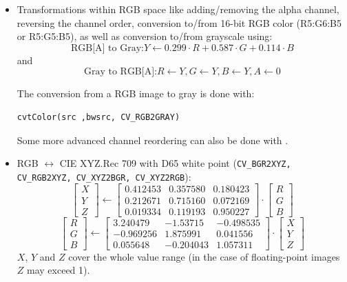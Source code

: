 \begin{itemize}
 \item Transformations within RGB space like adding/removing the alpha channel, reversing the channel order, conversion to/from 16-bit RGB color (R5:G6:B5 or R5:G5:B5), as well as conversion to/from grayscale using:
 \[
 \text{RGB[A] to Gray:} Y \leftarrow 0.299 \cdot R + 0.587 \cdot G + 0.114 \cdot B
 \]
 and
 \[
 \text{Gray to RGB[A]:} R \leftarrow Y, G \leftarrow Y, B \leftarrow Y, A \leftarrow 0
 \]

The conversion from a RGB image to gray is done with:
\begin{lstlisting}
cvtColor(src ,bwsrc, CV_RGB2GRAY)
\end{lstlisting}

Some more advanced channel reordering can also be done with .

 \item RGB $\leftrightarrow$ CIE XYZ.Rec 709 with D65 white point (\texttt{CV\_BGR2XYZ, CV\_RGB2XYZ, CV\_XYZ2BGR, CV\_XYZ2RGB}):
 \[
 \begin{bmatrix}
 X \\
 Y \\
 Z
 \end{bmatrix}
 \leftarrow
 \begin{bmatrix}
0.412453 & 0.357580 & 0.180423\\
0.212671 & 0.715160 & 0.072169\\
0.019334 & 0.119193 & 0.950227
 \end{bmatrix}
 \cdot
 \begin{bmatrix}
 R \\
 G \\
 B
 \end{bmatrix}
 \]
 \[
 \begin{bmatrix}
 R \\
 G \\
 B
 \end{bmatrix}
 \leftarrow
 \begin{bmatrix}
3.240479 & -1.53715 & -0.498535\\
-0.969256 &  1.875991 & 0.041556\\
0.055648 & -0.204043 & 1.057311
 \end{bmatrix}
 \cdot
 \begin{bmatrix}
 X \\
 Y \\
 Z
 \end{bmatrix}
 \]
$X$, $Y$ and $Z$ cover the whole value range (in the case of floating-point images $Z$ may exceed 1).


\end{itemize}
